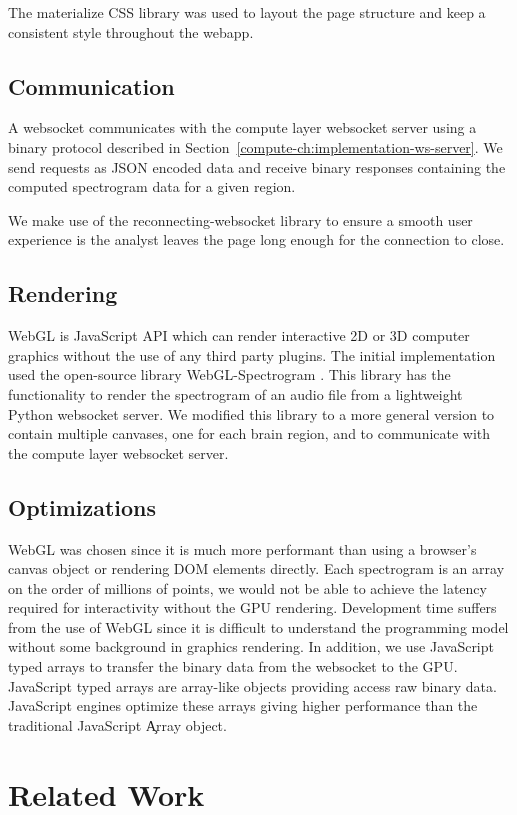 The materialize CSS library \cite{materialize} was used to layout the page
structure and keep a consistent style throughout the webapp.

\subsection{Communication}

A websocket communicates with the compute layer websocket server using a binary
protocol described in Section~\ref{compute-ch:implementation-ws-server}. We
send requests as JSON encoded data and receive binary responses containing the
computed spectrogram data for a given region.

We make use of the reconnecting-websocket \cite{reconnecting-websocket} library
to ensure a smooth user experience is the analyst leaves the page long enough
for the connection to close.

\subsection{Rendering}

WebGL is JavaScript API which can render interactive 2D or 3D computer graphics
without the use of any third party plugins. The initial implementation used the
open-source library WebGL-Spectrogram \cite{webgl-spectrogram}. This library
has the functionality to render the spectrogram of an audio file from a
lightweight Python websocket server. We modified this library to a more general
version to contain multiple canvases, one for each brain region, and to
communicate with the compute layer websocket server. \\

\subsection{Optimizations}

WebGL was chosen since it is much more performant than using a browser's canvas
object or rendering DOM elements directly. Each spectrogram is an array on the
order of millions of points, we would not be able to achieve the latency
required for interactivity without the GPU rendering. Development time suffers
from the use of WebGL since it is difficult to understand the programming model
without some background in graphics rendering. In addition, we use JavaScript
typed arrays to transfer the binary data from the websocket to the GPU.
JavaScript typed arrays are array-like objects providing access raw binary
data. JavaScript engines optimize these arrays giving higher performance than
the traditional JavaScript \c{Array} object.

\section{Related Work}

